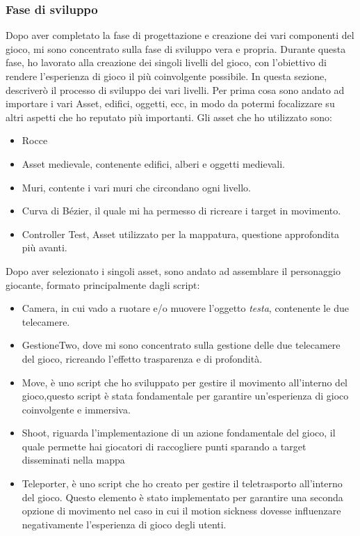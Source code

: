 \documentclass[
a4paper,
cleardoublepage=empty,
headings=twolinechapter,
numbers=autoenddot,
]{scrbook}
\begin{document}
    \subsubsection{Fase di sviluppo}
    Dopo aver completato la fase di progettazione e creazione dei vari componenti del gioco, mi sono concentrato sulla fase di sviluppo vera e propria. Durante questa fase, ho lavorato alla creazione dei singoli livelli del gioco, con l'obiettivo di rendere l'esperienza di gioco il più coinvolgente possibile. In questa sezione, descriverò il processo di sviluppo dei vari livelli.
    Per prima cosa sono andato ad importare i vari Asset, edifici, oggetti, ecc, in modo da potermi focalizzare su altri aspetti che ho reputato più importanti.
    Gli asset che ho utilizzato sono:
    \begin{itemize}
    	\item Rocce\cite{Rock_asset}
    	\item Asset medievale\cite{Pack_asset}, contenente edifici, alberi e oggetti medievali. 
    	\item Muri\cite{Wall_asset}, contente i vari muri che circondano ogni livello.
    	\item Curva di Bézier\cite{Pack_asset}, il quale mi ha permesso di ricreare i target in movimento.
    	\item Controller Test\cite{Controller_test}, Asset utilizzato per la mappatura, questione approfondita più avanti.
    \end{itemize}
    Dopo aver selezionato i singoli asset, sono andato ad assemblare il personaggio giocante, formato principalmente dagli script:
    \begin{itemize}
        \item Camera, in cui vado a ruotare e/o muovere l'oggetto \textit{testa}, contenente le due telecamere.
        \item GestioneTwo, dove mi sono concentrato sulla gestione delle due telecamere del gioco, ricreando l'effetto trasparenza e di profondità.
        \item Move, è uno script che ho sviluppato per gestire il movimento all'interno del gioco,questo script è stata fondamentale per garantire un'esperienza di gioco coinvolgente e immersiva.
        \item Shoot, riguarda l'implementazione di un azione fondamentale del gioco, il quale permette hai giocatori di raccogliere punti sparando a target disseminati nella mappa
        \item Teleporter, è uno script che ho creato per gestire il teletrasporto all'interno del gioco. Questo elemento è stato implementato per garantire una seconda opzione di movimento nel caso in cui il motion sickness\cite{mottion_sickness} dovesse influenzare negativamente l'esperienza di gioco degli utenti.
    \end{itemize}
\end{document}
